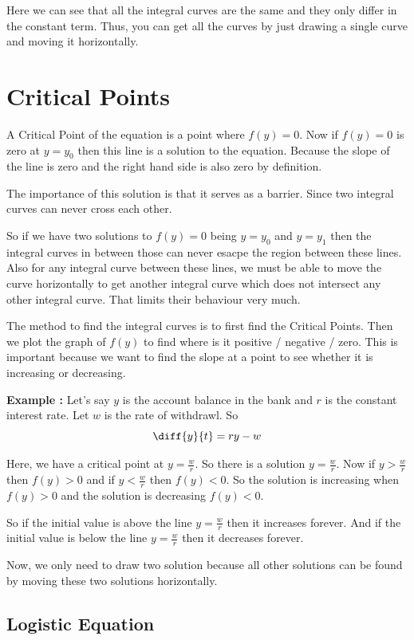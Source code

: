 Here we can see that all the integral curves are the same and they only differ in the constant term.
Thus, you can get all the curves by just drawing a single curve and moving it horizontally.

\section{Critical Points}

A Critical Point of the equation is a point where $f(y) = 0$.
Now if $f(y) = 0$ is zero at $y = y_0$ then this line is a solution to the equation.
Because the slope of the line is zero and the right hand side is also zero by definition.


The importance of this solution is that it serves as a barrier.
Since two integral curves can never cross each other.

So if we have two solutions to $f(y) = 0$ being $y = y_0$ and $y = y_1$ then the integral curves in between those can never esacpe the region between these lines.
Also for any integral curve between these lines, we must be able to move the curve horizontally to get another integral curve which does not intersect any other integral curve.
That limits their behaviour very much.

The method to find the integral curves is to first find the Critical Points.
Then we plot the graph of $f(y)$ to find where is it positive / negative / zero.
This is important because we want to find the slope at a point to see whether it is increasing or decreasing.

{\bf Example : } Let's say $y$ is the account balance in the bank and $r$ is the constant interest rate.
Let $w$ is the rate of withdrawl.
So $$ \diff{y}{t} = ry - w $$

Here, we have a critical point at $y = \frac{w}{r}$.
So there is a solution $y = \frac{w}{r}$.
Now if $y > \frac{w}{r}$ then $f(y) > 0$ and if $y < \frac{w}{r}$ then $f(y) < 0$.
So the solution is increasing when $f(y) > 0$ and the solution is decreasing $f(y) < 0$.

So if the initial value is above the line $y = \frac{w}{r}$ then it increases forever.
And if the initial value is below the line $y = \frac{w}{r}$ then it decreases forever.

Now, we only need to draw two solution because all other solutions can be found by moving these two solutions horizontally.

\subsection{Logistic Equation}

